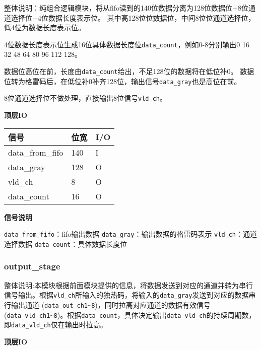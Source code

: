 \documentclass[12pt,]{article}
\begin{document}
整体说明：纯组合逻辑模块，将从fifo读到的140位数据分离为128位数据位+8位通道选择位+4位数据长度表示位。
其中高128位位数据位，中间8位位通道选择位，低4位为数据长度表示位。

4位数据长度表示位生成16位具体数据长度位\texttt{data\_count}，例如0-8分别输出0
16 32 48 64 80 96 112 128。

数据位高位在前，长度由\texttt{data\_count}给出，不足128位的数据将在低位补0。
数据位转为格雷码后，在低位补0补齐128位，输出信号\texttt{data\_gray}也是高位在前。

8位通道选择位不做处理，直接输出8位信号\texttt{vld\_ch}。

\textbf{顶层IO}

\begin{longtable}[]{@{}lll@{}}
\toprule\noalign{}
信号 & 位宽 & I/O \\
\midrule\noalign{}
\endhead
\bottomrule\noalign{}
\endlastfoot
data\_from\_fifo & 140 & I \\
data\_gray & 128 & O \\
vld\_ch & 8 & O \\
data\_count & 16 & O \\
\end{longtable}

\textbf{信号说明}

\texttt{data\_from\_fifo}：fifo输出数据
\texttt{data\_gray}：输出数据的格雷码表示 \texttt{vld\_ch}：通道选择数据
\texttt{data\_count}：具体数据长度位

\hypertarget{output_stage}{%
\subsubsection{output\_stage}\label{output_stage}}

整体说明:本模块根据前面模块提供的信息，将数据发送到对应的通道并转为串行信号输出。根据\texttt{vld\_ch}所输入的独热码，将输入的\texttt{data\_gray}发送到对应的数据串行输出通道
(\texttt{data\_out\_ch1\textasciitilde{}8})，同时拉高对应通道的数据有效信号
(\texttt{data\_vld\_ch1\textasciitilde{}8})。根据\texttt{data\_count}，具体决定输出\texttt{data\_vld\_ch}的持续周期数，即\texttt{data\_vld\_ch}仅在输出时拉高。

\textbf{顶层IO}
\end{document}
